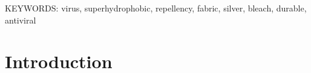 \documentclass[journal=jacsat,manuscript=article]{achemso}
\begin{document}
KEYWORDS:  virus, superhydrophobic, repellency, fabric, silver, bleach, durable, antiviral


\section{Introduction}

\end{document}

